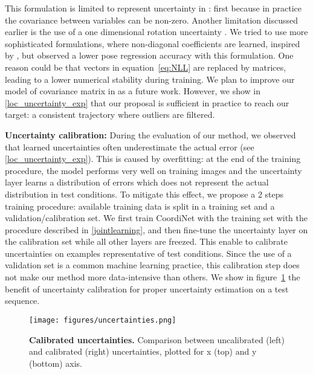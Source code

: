 \documentclass[10pt,twocolumn,letterpaper]{article}
\begin{document}
This formulation is limited to represent uncertainty in : first because in practice the covariance between variables can be non-zero. Another limitation discussed earlier is the use of a one dimensional rotation uncertainty .
We tried to use more sophisticated formulations, where non-diagonal coefficients are learned, inspired by \cite{multivariate,peretroukhin2019probabilistic}, but observed a lower pose regression accuracy with this formulation. One reason could be that vectors in equation~\ref{eq:NLL} are replaced by matrices, leading to a lower numerical stability during training. We plan to improve our model of covariance matrix in  as a future work. However, we show in \ref{loc_uncertainty_exp} that our proposal is sufficient in practice to reach our target: a consistent trajectory where outliers are filtered.

\label{subsec:calibrated_covariance}
\textbf{Uncertainty calibration:} During the evaluation of our method, we observed that learned uncertainties often underestimate the actual error (see \ref{loc_uncertainty_exp}). This is caused by overfitting: at the end of the training procedure, the model performs very well on training images and the uncertainty layer learns a distribution of errors which does not represent the actual distribution in test conditions. To mitigate this effect, we propose a 2 steps training procedure: available training data is split in a training set and a validation/calibration set. We first train CoordiNet with the training set with the procedure described in \ref{jointlearning}, and then fine-tune the uncertainty layer on the calibration set while all other layers are freezed. This enable to calibrate uncertainties on examples representative of test conditions. Since the use of a validation set is a common machine learning practice, this calibration step does not make our method more data-intensive than others. We show in figure~\ref{calibrated_uncertainty} the benefit of uncertainty calibration for proper uncertainty estimation on a test sequence.


\begin{figure}[t]
\centering

\texttt{[image: figures/uncertainties.png]}
   
\caption{\textbf{Calibrated uncertainties.} Comparison between uncalibrated  (left) and calibrated (right) uncertainties, plotted for x (top) and y (bottom) axis.}\label{calibrated_uncertainty}
\end{figure} 
\end{document}
